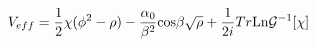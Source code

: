 \begin{equation}
V_{eff} =  \frac{1}{2} \chi( \phi^2 - \rho)  -\frac{\alpha_0}{\beta^2} {\rm
cos} \beta \sqrt{\rho}+ \frac{1}{2i} Tr {\rm Ln} {\cal G}^{-1}[\chi]
\end{equation}

